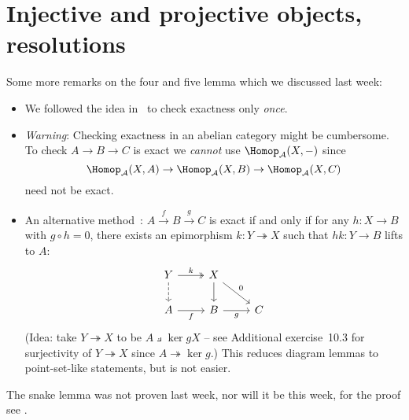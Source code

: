 \documentclass[../main.tex]{subfiles}
\begin{document}
\chapter{Injective and projective objects, resolutions}\label{lecture:11}



Some more remarks on the four and five lemma which we discussed last week:
\begin{itemize}
    \item We followed the idea in~\cite{IversenCohomologyOfSheaves} to check exactness only \emph{once}.
    \item \emph{Warning}: Checking exactness in an abelian category might be cumbersome. To check $A\to B\to C$ is exact we \emph{cannot} use $\Hom[\cat A](X, -)$ since
    \[\Hom[\cat A](X,A) \to \Hom[\cat A](X, B) \to \Hom[\cat A](X,C)\]
    need not be exact.
    \item An alternative method~\cite[Tag~08N5]{stacks-project}: $A\xrightarrow{f} B\xrightarrow{g} C$ is exact if and only if for any $h\colon X\to B$ with $g\circ h= 0$, there exists an epimorphism $k\colon Y\twoheadrightarrow X$ such that $hk\colon Y\to B$ lifts to $A$: 
    \[\begin{tikzcd}
    	Y & X \\
    	A & B & C
    	\arrow["k", two heads, from=1-1, to=1-2]
    	\arrow[from=1-1, to=2-1, dashed]
    	\arrow[from=1-2, to=2-2]
    	\arrow["0", from=1-2, to=2-3]
    	\arrow["f"', from=2-1, to=2-2]
    	\arrow["g"', from=2-2, to=2-3]
    \end{tikzcd}\]
    (Idea: take $Y\twoheadrightarrow X$ to be $A\pullback{\ker g} X$ -- see Additional exercise~10.3 for surjectivity of $Y\twoheadrightarrow X$ since $A\twoheadrightarrow \ker g$.)
    This reduces diagram lemmas to point-set-like statements, but is not easier.
\end{itemize}

The snake lemma was not proven last week, nor will it be this week, for the proof see \cite[\S~\RN{1}.1]{IversenCohomologyOfSheaves}.
\end{document}
